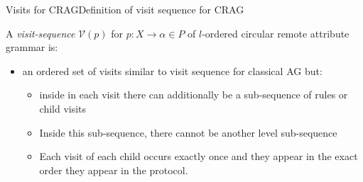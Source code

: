 
\begin{frame}{Visits for CRAG}{Definition of visit sequence for CRAG}

A \emph{visit-sequence} $\mathscr{V}(p)$ for $p{:} X \rightarrow \alpha \in P$ of $l$-ordered circular remote attribute grammar is:

\begin{itemize}
    \item an ordered set of visits similar to visit sequence for classical AG but:
    \begin{itemize}
        \item inside in each visit there can additionally be a sub-sequence of rules or child visits
        \item Inside this sub-sequence, there cannot be another level sub-sequence \item Each visit of each child occurs exactly once and they appear in the exact order they appear in the protocol.
    \end{itemize}
\end{itemize}

\end{frame}



